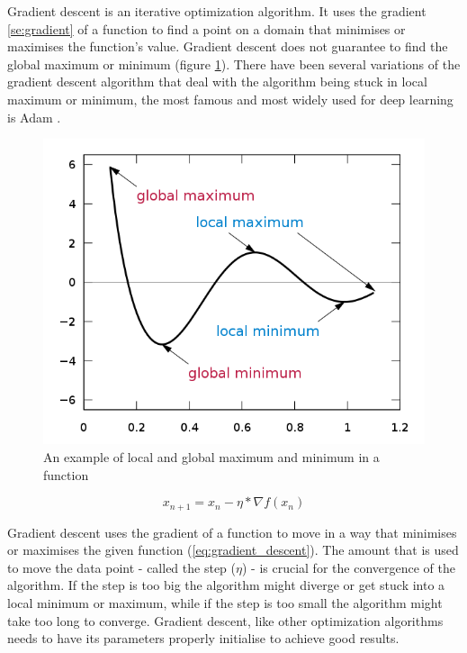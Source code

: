 \documentclass[times, utf8, diplomski]{fer}
\begin{document}
Gradient descent is an iterative optimization algorithm. It uses the gradient \ref{se:gradient} of a function to find a point on a domain that minimises or maximises the function's value. Gradient descent does not guarantee to find the global maximum or minimum (figure \ref{fig:local_and_global_function_values}). There have been several variations of the gradient descent algorithm that deal with the algorithm being stuck in local maximum or minimum, the most famous and most widely used for deep  learning is Adam \citep{kingma_adam:_2014}.

\begin{figure}
  \includegraphics[scale=0.5]{figures/local_global_maxima_minima.png}
  \centering
  \caption{An example of local and global maximum and minimum in a function}
  \label{fig:local_and_global_function_values}
\end{figure}

\begin{equation} 
\label{eq:gradient_descent}
	x_{n+1} = x_n - \eta * \nabla{f(x_n)}
\end{equation}

Gradient descent uses the gradient of a function to move in a way that minimises or maximises the given function (\ref{eq:gradient_descent}). The amount that is used to move the data point - called the step ($\eta$) - is crucial for the convergence of the algorithm. If the step is too big the algorithm might diverge or get stuck into a local minimum or maximum, while if the step is too small the algorithm might take too long to converge. Gradient descent, like other optimization algorithms needs to have its parameters properly initialise to achieve good results.
\end{document}
